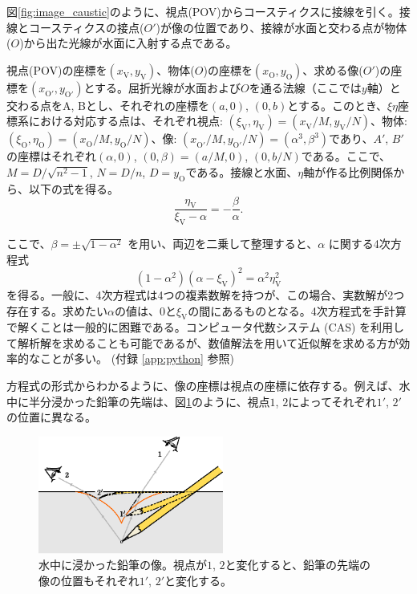 \documentclass[twocolumn]{article}
\begin{document}
図\ref{fig:image_caustic}のように、視点(POV)からコースティクスに接線を引く。接線とコースティクスの接点($O'$)が像の位置であり、接線が水面と交わる点が物体($O$)から出た光線が水面に入射する点である。

視点(POV)の座標を$(x_{\mathrm{V}}^{}, y_{\mathrm{V}}^{})$、物体($O$)の座標を$(x_{\mathrm{O}}^{}, y_{\mathrm{O}}^{})$、求める像($O'$)の座標を$(x_{\mathrm{O'}}^{}, y_{\mathrm{O'}}^{})$とする。屈折光線が水面および$O$を通る法線（ここでは$y$軸）と交わる点をA, Bとし、それぞれの座標を$(a, 0)$, $(0, b)$とする。このとき、$\xi\eta$座標系における対応する点は、それぞれ視点: $(\xi_{\mathrm{V}}^{}, \eta_{\mathrm{V}}^{})=(x_{\mathrm{V}}^{}/M, y_{\mathrm{V}}^{}/N)$、物体: $(\xi_{\mathrm{O}}^{}, \eta_{\mathrm{O}}^{})=(x_{\mathrm{O}}^{}/M, y_{\mathrm{O}}^{}/N)$、像: $(x_{\mathrm{O'}}^{}/M, y_{\mathrm{O'}}^{}/N)=(\alpha^3, \beta^3)$であり、$A'$, $B'$の座標はそれぞれ$(\alpha, 0)$, $(0, \beta)=(a/M, 0)$, $(0, b/N)$である。ここで、$M=D/\sqrt{n^2-1}$, $N=D/n$, $D=y_{\mathrm{O}}^{}$である。接線と水面、$\eta$軸が作る比例関係から、以下の式を得る。
$$\dfrac{\eta_{\mathrm{V}}^{}}{\xi_{\mathrm{V}}^{}-\alpha}=-\dfrac{\beta}{\alpha}.$$

ここで、$\beta = \pm \sqrt{1-\alpha^2}$ を用い、両辺を二乗して整理すると、$\alpha$ に関する4次方程式
\[
\left( 1 - \alpha^2 \right) \left(\alpha-\xi_{\mathrm{V}} \right)^2 = \alpha^2 \eta_{\mathrm{V}}^2
\]
を得る。一般に、4次方程式は4つの複素数解を持つが、この場合、実数解が2つ存在する。求めたい$\alpha$の値は、0と$\xi_{\mathrm{V}}$の間にあるものとなる。4次方程式を手計算で解くことは一般的に困難である。コンピュータ代数システム (CAS) を利用して解析解を求めることも可能であるが、数値解法を用いて近似解を求める方が効率的なことが多い。 (付録 \ref{app:python} 参照)

方程式の形式からわかるように、像の座標は視点の座標に依存する。例えば、水中に半分浸かった鉛筆の先端は、図\ref{fig:pencil_view}のように、視点$1$, $2$によってそれぞれ$1'$, $2'$の位置に異なる。
	
\begin{figure}[h]
	\centering
	\includegraphics[width=2.4in]{figs/g43.eps}
	\caption{水中に浸かった鉛筆の像。視点が$1$, $2$と変化すると、鉛筆の先端の像の位置もそれぞれ$1'$, $2'$と変化する。}
	\label{fig:pencil_view}
\end{figure}
\end{document}
